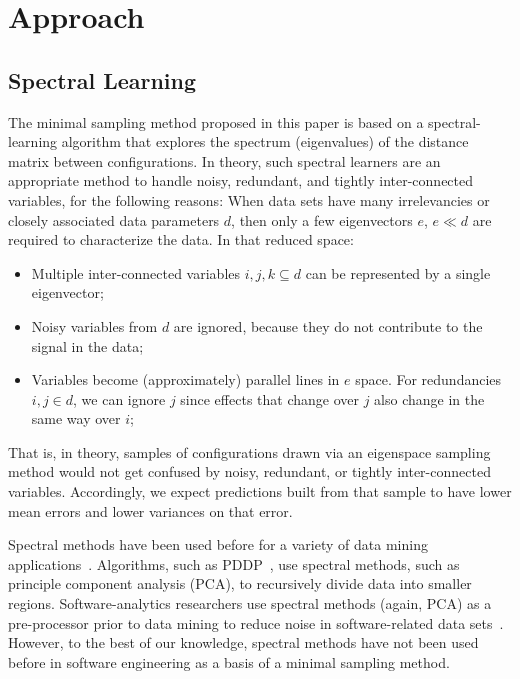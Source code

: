 \documentclass{newsig}
\begin{document}
 \section{Approach}

\subsection{Spectral Learning}\label{sect:spect}

The minimal sampling method proposed in this paper is based on a spectral-learning algorithm
that  explores the spectrum (eigenvalues) of the distance matrix between  configurations.
In theory, such spectral learners are an appropriate method to handle noisy, redundant, and tightly inter-connected variables, for the following reasons:
When data sets have many irrelevancies or closely associated data parameters $d$, then
only a few eigenvectors $e$, $e \ll d$  are required to characterize the data.
In that reduced space:
\begin{itemize}
\item
Multiple inter-connected variables $i,j,k \subseteq d$ can be represented
by a single eigenvector;
\item
Noisy variables from $d$ are
ignored, because they  do not contribute to the signal in the data;
\item
Variables  become (approximately) parallel lines
in $e$ space. For  redundancies \mbox{$i,j \in d$}, we
can ignore $j$
since effects that change over $j$ also
change in the same way over $i$;
\end{itemize}
That is, in theory, samples of configurations drawn via an eigenspace sampling method
would not get confused by noisy, redundant, or tightly inter-connected variables. Accordingly,
we expect predictions built from that sample to have  lower mean errors and lower variances on that error.

Spectral methods have been used before for a variety of data mining applications~\cite{kamvar2003spectral}.
Algorithms, such as PDDP~\cite{boley98}, use spectral methods, such as principle component analysis (PCA), to
recursively divide data into smaller regions.  Software-analytics researchers use spectral methods (again, PCA) as a pre-processor prior to data mining  to reduce noise in software-related data sets~\cite{Theisen15}.
However, to the best of our knowledge, spectral methods have not been used before in software engineering as a basis of a minimal sampling method.
\end{document}
